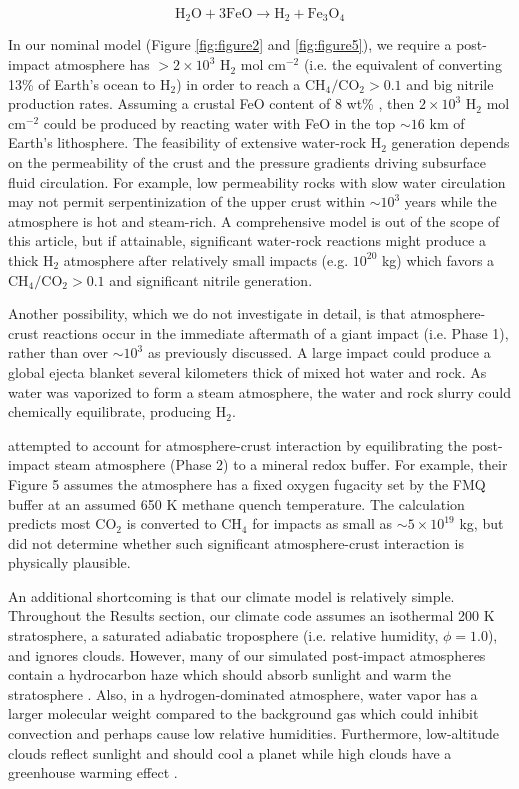 \begin{equation} \label{eq:serp}
  \mathrm{H_2O} + 3 \mathrm{FeO} \rightarrow \mathrm{H_2} + \mathrm{Fe_3O_4}
\end{equation}

In our nominal model (Figure \ref{fig:figure2} and \ref{fig:figure5}), we require a post-impact atmosphere has $> 2 \times 10^3$ H$_2$ mol cm$^{-2}$ (i.e. the equivalent of converting 13\% of Earth's ocean to H$_2$) in order to reach a $\mathrm{CH_4}/\mathrm{CO_2} > 0.1$ and big nitrile production rates. Assuming a crustal FeO content of 8 wt\% \citep{Takahashi_1986}, then $2 \times 10^3$ H$_2$ mol cm$^{-2}$ could be produced by reacting water with FeO in the top $\sim 16$ km of Earth's lithosphere. The feasibility of extensive water-rock H$_2$ generation depends on the permeability of the crust and the pressure gradients driving subsurface fluid circulation. For example, low permeability rocks with slow water circulation may not permit serpentinization of the upper crust within $\sim 10^3$ years while the atmosphere is hot and steam-rich. A comprehensive model is out of the scope of this article, but if attainable, significant water-rock reactions might produce a thick H$_2$ atmosphere after relatively small impacts (e.g. $10^{20}$ kg) which favors a $\mathrm{CH_4}/\mathrm{CO_2} > 0.1$ and significant nitrile generation. 

Another possibility, which we do not investigate in detail, is that atmosphere-crust reactions occur in the immediate aftermath of a giant impact (i.e. Phase 1), rather than over $\sim 10^3$ as previously discussed. A large impact could produce a global ejecta blanket several kilometers thick of mixed hot water and rock. As water was vaporized to form a steam atmosphere, the water and rock slurry could chemically equilibrate, producing H$_2$.

\citet{Zahnle_2020} attempted to account for atmosphere-crust interaction by equilibrating the post-impact steam atmosphere (Phase 2) to a mineral redox buffer. For example, their Figure 5 assumes the atmosphere has a fixed oxygen fugacity set by the FMQ buffer at an assumed 650 K methane quench temperature. The calculation predicts most CO$_2$ is converted to CH$_4$ for impacts as small as $\sim 5 \times 10^{19}$ kg, but \citet{Zahnle_2020} did not determine whether such significant atmosphere-crust interaction is physically plausible.

An additional shortcoming is that our climate model is relatively simple. Throughout the Results section, our climate code assumes an isothermal 200 K stratosphere, a saturated adiabatic troposphere (i.e. relative humidity, $\phi = 1.0$), and ignores clouds. However, many of our simulated post-impact atmospheres contain a hydrocarbon haze which should absorb sunlight and warm the stratosphere \citep{Arney_2016}. Also, in a hydrogen-dominated atmosphere, water vapor has a larger molecular weight compared to the background gas which could inhibit convection \citep{Leconte_2017} and perhaps cause low relative humidities. Furthermore, low-altitude clouds reflect sunlight and should cool a planet while high clouds have a greenhouse warming effect \citep{Goldblatt_2011}.

